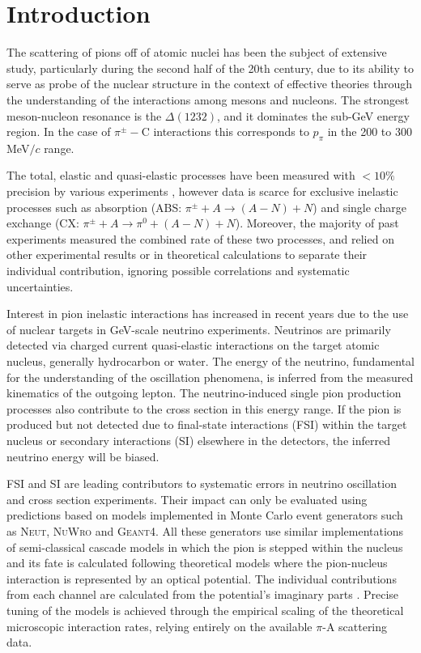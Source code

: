 \section{\label{sec:intro}Introduction\protect}
The scattering of pions off of atomic nuclei has been the subject of extensive study, particularly during the second half of the 20th century, due to its ability to serve as probe of the nuclear structure in the context of effective theories through the understanding of the interactions among mesons and nucleons. The strongest meson-nucleon resonance is the $\Delta(1232)$, and it dominates the sub-GeV energy region. In the case of $\pi^{\pm}-$C interactions this corresponds to $p_{\pi}$ in the 200 to 300 MeV$/c$ range.

The total, elastic and quasi-elastic processes have been measured with $<10\%$ precision by various experiments \cite{Allardyce,Binon,Saunders,Gelderloos,Levenson,Ashery2,Ingram,Jones,Ashery,Bellotti1973,Bellotti1973_2}, however data is scarce for exclusive inelastic processes such as absorption (ABS: $\pi^{\pm}+A\rightarrow (A-N) + N$) and single charge exchange (CX: $\pi^{\pm} + A \rightarrow \pi^{0}+ (A-N) + N$). Moreover, the majority of past experiments measured the combined rate of these two processes, and relied on other experimental results or in theoretical calculations to separate their individual contribution, ignoring possible correlations and systematic uncertainties.

Interest in pion inelastic interactions has increased in recent years due to the use of nuclear targets in GeV-scale neutrino experiments. Neutrinos are primarily detected via charged current quasi-elastic interactions on the target atomic nucleus, generally hydrocarbon or water. The energy of the neutrino, fundamental for the understanding of the oscillation phenomena, is inferred from the measured kinematics of the outgoing lepton. The neutrino-induced single pion production processes also contribute to the cross section in this energy range. If the pion is produced but not detected due to final-state interactions (FSI) within the target nucleus or secondary interactions (SI) elsewhere in the detectors, the inferred neutrino energy will be biased. 

FSI and SI are leading contributors to systematic errors in neutrino oscillation and cross section experiments. Their impact can only be evaluated using predictions based on models implemented in Monte Carlo event generators such as \textsc{Neut}\cite{NEUT}, \textsc{NuWro}\cite{NuWro} and \textsc{Geant4}\cite{bertini}. All these generators use similar implementations of semi-classical cascade models in which the pion is stepped within the nucleus and its fate is calculated following theoretical models where the pion-nucleus interaction is represented by an optical potential. The individual contributions from each channel are calculated from the potential's imaginary parts \cite{Oset,Salcedo}. Precise tuning of the models is achieved through the empirical scaling of the theoretical microscopic interaction rates, relying entirely on the available $\pi$-A scattering data.

